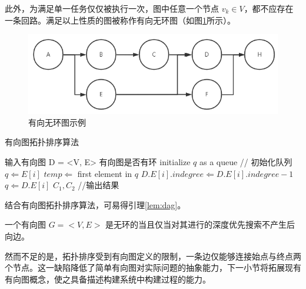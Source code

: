 此外，为满足单一任务仅仅被执行一次，图中任意一个节点 $v_k \in V$，都不应存在一条回路。满足以上性质的图被称作有向无环图（如图\ref{fig:dag}所示）。

\begin{figure}[htb]
    \centering
    \includegraphics[width=.7\textwidth]{figures/dag.png}
    \caption{有向无环图示例}
    \label{fig:dag}
\end{figure}

\vskip 13.8pt
\renewcommand{\thealgorithm}{2}
    \begin{algorithm}
        \caption{有向图拓扑排序算法}
        \begin{algorithmic}[1]
            \Require 输入有向图 D = <V, E>
            \Ensure 有向图是否有环
            \State initialize $q$ as a queue // 初始化队列
                    \State $q \Leftarrow E[i]$
                \EndIf
            \EndFor
                \State $temp \Leftarrow$ first element in $q$
                        \State $D.E[i].indegree \Leftarrow D.E[i].indegree - 1$
                            $q \Leftarrow D.E[i]$
                        \EndIf
                    \EndIf
                \EndFor
            \EndWhile
            \State \Return $C_1, C_2$ //输出结果
        \end{algorithmic}
        \label{alg:topology-sort}
    \end{algorithm}
    \vskip 13.8pt

结合有向图拓扑排序算法，可易得引理\ref{lem:dag}。

\begin{lem}
    一个有向图 $G = <V, E>$ 是无环的当且仅当对其进行的深度优先搜索不产生后向边。\cite{DBLP:books/daglib/0023376}
    \label{lem:dag}
\end{lem}

然而不足的是，拓扑排序受到有向图定义的限制，一条边仅能够连接始点与终点两个节点。这一缺陷降低了简单有向图对实际问题的抽象能力，下一小节将拓展现有有向图概念，使之具备描述构建系统中构建过程的能力。

